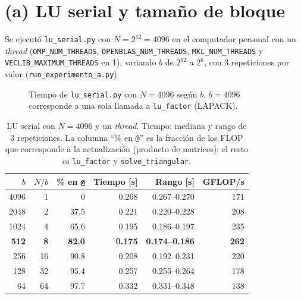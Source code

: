 \documentclass[11pt,a4paper]{article}
\begin{document}
\section{(a) LU serial y tamaño de bloque}
Se ejecutó \texttt{lu\_serial.py} con $N=2^{12}=4096$ en el computador personal con un \emph{thread} (\texttt{OMP\_NUM\_THREADS}, \texttt{OPENBLAS\_NUM\_THREADS}, \texttt{MKL\_NUM\_THREADS} y \texttt{VECLIB\_MAXIMUM\_THREADS} en 1), variando $b$ de $2^{12}$ a $2^6$, con 3 repeticiones por valor (\texttt{run\_experimento\_a.py}).

\begin{figure}[H]\centering
{}
\caption{Tiempo de \texttt{lu\_serial.py} con $N=4096$ según $b$. $b=4096$ corresponde a una sola llamada a \texttt{lu\_factor} (LAPACK).}
\label{fig:a}
\end{figure}

\begin{table}[H]
\centering\small
\caption{LU serial con $N=4096$ y un \emph{thread}. Tiempo: mediana y rango de 3 repeticiones. La columna ``\% en \texttt{@}'' es la fracción de los FLOP que corresponde a la actualización (producto de matrices); el resto es \texttt{lu\_factor} y \texttt{solve\_triangular}.}
\label{tab:a}
\begin{tabular}{rrrrrr}
\toprule
$b$ & $N/b$ & \% en \texttt{@} & Tiempo [s] & Rango [s] & GFLOP/s \\
\midrule
4096 & 1  & 0    & 0.268 & 0.267--0.270 & 171 \\
2048 & 2  & 37.5 & 0.221 & 0.220--0.228 & 208 \\
1024 & 4  & 65.6 & 0.195 & 0.186--0.197 & 235 \\
\textbf{512} & \textbf{8} & \textbf{82.0} & \textbf{0.175} & \textbf{0.174--0.186} & \textbf{262} \\
256  & 16 & 90.8 & 0.208 & 0.192--0.231 & 220 \\
128  & 32 & 95.4 & 0.257 & 0.255--0.264 & 178 \\
64   & 64 & 97.7 & 0.332 & 0.331--0.348 & 138 \\
\bottomrule
\end{tabular}
\end{table}
\end{document}
